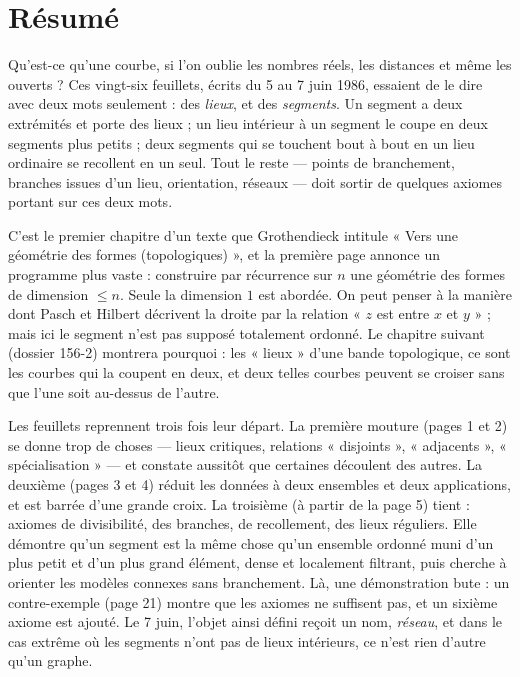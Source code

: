 \documentclass[11pt,a4paper]{article}
\begin{document}
\section*{Résumé}

\begin{resume}
Qu'est-ce qu'une courbe, si l'on oublie les nombres réels, les distances et
même les ouverts ? Ces vingt-six feuillets, écrits du 5 au 7 juin 1986,
essaient de le dire avec deux mots seulement : des \emph{lieux}, et des
\emph{segments}. Un segment a deux extrémités et porte des lieux ; un lieu
intérieur à un segment le coupe en deux segments plus petits ; deux segments
qui se touchent bout à bout en un lieu ordinaire se recollent en un seul. Tout
le reste --- points de branchement, branches issues d'un lieu, orientation,
réseaux --- doit sortir de quelques axiomes portant sur ces deux mots.

C'est le premier chapitre d'un texte que Grothendieck intitule « Vers une
géométrie des formes (topologiques) », et la première page annonce un
programme plus vaste : construire par récurrence sur $n$ une géométrie des
formes de dimension $\leq n$. Seule la dimension $1$ est abordée. On peut
penser à la manière dont Pasch et Hilbert décrivent la droite par la
relation « $z$ est entre $x$ et $y$ » ; mais ici le segment n'est pas
supposé totalement ordonné. Le chapitre suivant (dossier 156-2) montrera
pourquoi : les « lieux » d'une bande topologique, ce sont les courbes qui la
coupent en deux, et deux telles courbes peuvent se croiser sans que l'une soit
au-dessus de l'autre.

Les feuillets reprennent trois fois leur départ. La première mouture (pages 1
et 2) se donne trop de choses --- lieux critiques, relations « disjoints »,
« adjacents », « spécialisation » --- et constate aussitôt que certaines
découlent des autres. La deuxième (pages 3 et 4) réduit les données à deux
ensembles et deux applications, et est barrée d'une grande croix. La troisième
(à partir de la page 5) tient : axiomes de divisibilité, des branches, de
recollement, des lieux réguliers. Elle démontre qu'un segment est la même
chose qu'un ensemble ordonné muni d'un plus petit et d'un plus grand élément,
dense et localement filtrant, puis cherche à orienter les modèles connexes
sans branchement. Là, une démonstration bute : un contre-exemple (page 21)
montre que les axiomes ne suffisent pas, et un sixième axiome est ajouté. Le
7 juin, l'objet ainsi défini reçoit un nom, \emph{réseau}, et dans le cas
extrême où les segments n'ont pas de lieux intérieurs, ce n'est rien d'autre
qu'un graphe.


\end{resume}
\end{document}
